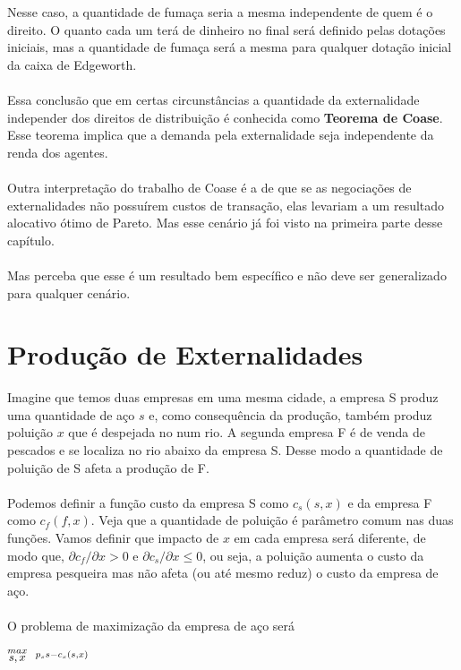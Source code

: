 \documentclass[a4paper,11pt,oneside]{book}
\theoremstyle{definition}
\theoremstyle{break}
\begin{document}
Nesse caso, a quantidade de fumaça seria a mesma independente de quem é o direito. O quanto cada um terá de dinheiro no final será definido pelas dotações iniciais, mas a quantidade de fumaça será a mesma para qualquer dotação inicial da caixa de Edgeworth.
\\~\\
Essa conclusão que em certas circunstâncias a quantidade da externalidade independer dos direitos de distribuição é conhecida como \textbf{Teorema de Coase}. Esse teorema implica que a demanda pela externalidade seja independente da renda dos agentes.
\\~\\
Outra interpretação do trabalho de Coase é a de que se as negociações de externalidades não possuírem custos de transação, elas levariam a um resultado alocativo ótimo de Pareto. Mas esse cenário já foi visto na primeira parte desse capítulo.
\\~\\
Mas perceba que esse é um resultado bem específico e não deve ser generalizado para qualquer cenário.

\section{Produção de Externalidades}

Imagine que temos duas empresas em uma mesma cidade, a empresa S produz uma quantidade de aço $s$ e, como consequência da produção, também produz poluição $x$ que é despejada no num rio. A segunda empresa F é de venda de pescados e se localiza no rio abaixo da empresa S. Desse modo a quantidade de poluição de S afeta a produção de F.
\\~\\
Podemos definir a função custo da empresa S como $c_s(s,x)$ e da empresa F como $c_f(f,x)$. Veja que a quantidade de poluição é parâmetro comum nas duas funções. Vamos definir que impacto de $x$ em cada empresa será diferente, de modo que, $\partial c_f/ \partial x > 0$ e $\partial c_s/ \partial x \leq 0$, ou seja, a poluição aumenta o custo da empresa pesqueira mas não afeta (ou até mesmo reduz) o custo da empresa de aço.
\\~\\
O problema de maximização da empresa de aço será

\begin{center}
	\LARGE $ \stackrel{max}{\text{\small $s,x$}} \ \ %
	\stackrel{p_s s - c_s(s,x)}{\ } $ %
\end{center}
\end{document}
